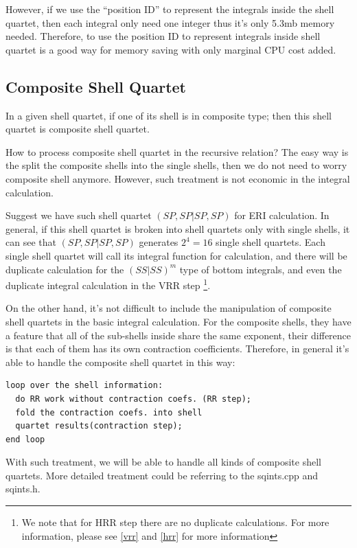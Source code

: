 However, if we use the ``position ID'' to represent the integrals 
inside the shell quartet, then each integral only need one integer 
thus it's only 5.3mb memory needed. Therefore, to use the position 
ID to represent integrals inside shell quartet is a good way for 
memory saving with only marginal CPU cost added.

\subsection{Composite Shell Quartet}
%
%
\label{composite_shell_quartet}

In a given shell quartet, if one of its shell is in composite type; 
then this shell quartet is composite shell quartet. 

How to process composite shell quartet in the recursive relation?
The easy way is the split the composite shells into the single 
shells, then we do not need to worry composite shell anymore. However,
such treatment is not economic in the integral calculation.

Suggest we have such shell quartet $(SP,SP|SP,SP)$ for ERI calculation.
In general, if this shell quartet is broken into shell quartets only 
with single shells, it can see that $(SP,SP|SP,SP)$ generates $2^{4} = 16$
single shell quartets. Each single shell quartet will call its integral
function for calculation, and there will be duplicate calculation for 
the $(SS|SS)^{m}$ type of bottom integrals, and even the duplicate integral calculation
in the VRR step \footnote{We note that for HRR step there are no duplicate calculations.
For more information, please see \ref{vrr} and \ref{hrr} for more 
information}.

On the other hand, it's not difficult to include the manipulation of 
composite shell quartets in the basic integral calculation. For the 
composite shells, they have a feature that all of the sub-shells inside
share the same exponent, their difference is that each of them has its 
own contraction coefficients. Therefore, in general it's able to handle
the composite shell quartet in this way:
\begin{verbatim}
loop over the shell information:
  do RR work without contraction coefs. (RR step);
  fold the contraction coefs. into shell 
  quartet results(contraction step);
end loop
\end{verbatim}
With such treatment, we will be able to handle all kinds of composite
shell quartets. More detailed treatment could be referring to the 
sqints.cpp and sqints.h.

